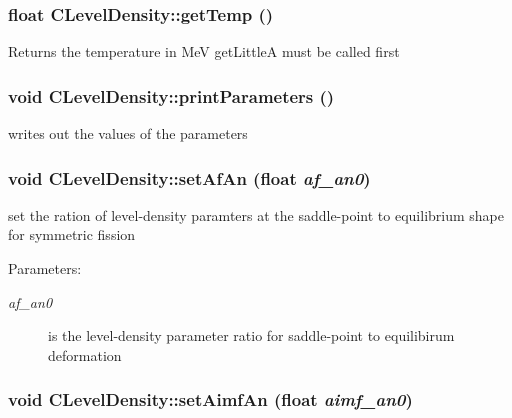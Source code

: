 \subsubsection{\setlength{\rightskip}{0pt plus 5cm}float CLevel\-Density::get\-Temp ()}\label{classCLevelDensity_e6c46c1ad332b9588dd9bb19f3d2d4b9}


Returns the temperature in Me\-V get\-Little\-A must be called first 
\subsubsection{\setlength{\rightskip}{0pt plus 5cm}void CLevel\-Density::print\-Parameters ()\hspace{0.3cm}{\tt  [static]}}\label{classCLevelDensity_36a2a7b8bed24bcff27e47c51cc2134d}


writes out the values of the parameters 
\subsubsection{\setlength{\rightskip}{0pt plus 5cm}void CLevel\-Density::set\-Af\-An (float {\em af\_\-an0})\hspace{0.3cm}{\tt  [static]}}\label{classCLevelDensity_cc0135aa7baed8b5748e0bff737f9502}


set the ration of level-density paramters at the saddle-point to equilibrium shape for symmetric fission \begin{Desc}
\item[Parameters:]
\begin{description}
\item[{\em af\_\-an0}]is the level-density parameter ratio for saddle-point to equilibirum deformation \end{description}
\end{Desc}
\subsubsection{\setlength{\rightskip}{0pt plus 5cm}void CLevel\-Density::set\-Aimf\-An (float {\em aimf\_\-an0})\hspace{0.3cm}{\tt  [static]}}\label{classCLevelDensity_038598d13bb39c8a2cec9c54549284e8}


